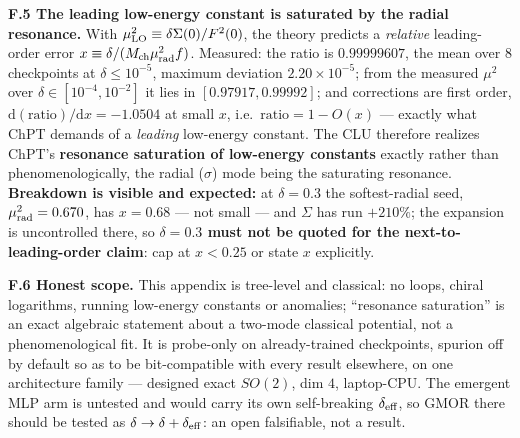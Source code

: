 \documentclass{article}
\begin{document}
\textbf{F.5 The leading low-energy constant is saturated by the radial resonance.} With $\mu^2_{\rm LO}\equiv\delta\Sigma(0)/F^2(0)$, the theory predicts a \emph{relative} leading-order error $x\equiv\delta/(M_{\rm ch}\mu_{\rm rad}^2f)$. Measured: the ratio is $0.99999607$, the mean over $8$ checkpoints at $\delta\le10^{-5}$, maximum deviation $2.20{\times}10^{-5}$; from the measured $\mu^2$ over $\delta\in[10^{-4},10^{-2}]$ it lies in $[0.97917,0.99992]$; and corrections are first order, $\mathrm{d}(\text{ratio})/\mathrm{d}x=-1.0504$ at small $x$, i.e.\ $\text{ratio}=1-O(x)$ --- exactly what ChPT demands of a \emph{leading} low-energy constant. The CLU therefore realizes ChPT's \textbf{resonance saturation of low-energy constants} exactly rather than phenomenologically, the radial ($\sigma$) mode being the saturating resonance. \textbf{Breakdown is visible and expected:} at $\delta=0.3$ the softest-radial seed, $\mu_{\rm rad}^2=0.670$, has $x=0.68$ --- not small --- and $\Sigma$ has run $+210\%$; the expansion is uncontrolled there, so \textbf{$\delta=0.3$ must not be quoted for the next-to-leading-order claim}: cap at $x<0.25$ or state $x$ explicitly.

\textbf{F.6 Honest scope.} This appendix is tree-level and classical: no loops, chiral logarithms, running low-energy constants or anomalies; ``resonance saturation'' is an exact algebraic statement about a two-mode classical potential, not a phenomenological fit. It is probe-only on already-trained checkpoints, spurion off by default so as to be bit-compatible with every result elsewhere, on one architecture family --- designed exact $SO(2)$, dim $4$, laptop-CPU. The emergent MLP arm is untested and would carry its own self-breaking $\delta_{\rm eff}$, so GMOR there should be tested as $\delta\to\delta+\delta_{\rm eff}$: an open falsifiable, not a result.
\end{document}
